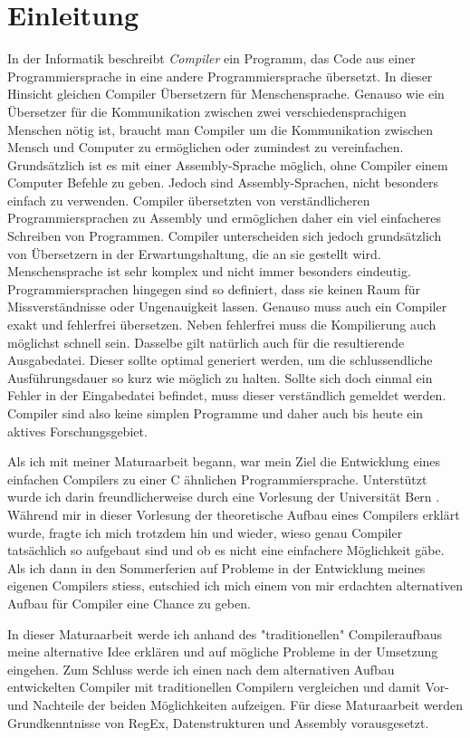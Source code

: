 \chapter{Einleitung}
In der Informatik beschreibt \textit{Compiler} ein Programm, das Code aus einer Programmiersprache in eine andere Programmiersprache übersetzt. In dieser Hinsicht gleichen Compiler Übersetzern für Menschensprache.
Genauso wie ein Übersetzer für die Kommunikation zwischen zwei verschiedensprachigen Menschen nötig ist, braucht man Compiler um die Kommunikation zwischen Mensch und Computer zu ermöglichen oder zumindest zu vereinfachen.
Grundsätzlich ist es mit einer Assembly-Sprache möglich, ohne Compiler einem Computer Befehle zu geben. Jedoch sind Assembly-Sprachen, nicht besonders einfach zu verwenden.
Compiler übersetzten von verständlicheren Programmiersprachen zu Assembly und ermöglichen daher ein viel einfacheres Schreiben von Programmen.
Compiler unterscheiden sich jedoch grundsätzlich von Übersetzern in der Erwartungshaltung, die an sie gestellt wird. Menschensprache ist sehr komplex und nicht immer besonders eindeutig. 
Programmiersprachen hingegen sind so definiert, dass sie keinen Raum für Missverständnisse oder Ungenauigkeit lassen. Genauso muss auch ein Compiler exakt und fehlerfrei übersetzen.
Neben fehlerfrei muss die Kompilierung auch möglichst schnell sein. Dasselbe gilt natürlich auch für die resultierende Ausgabedatei. Dieser sollte optimal generiert werden, um die schlussendliche
Ausführungsdauer so kurz wie möglich zu halten. Sollte sich doch einmal ein Fehler in der Eingabedatei befindet, muss dieser verständlich gemeldet werden. Compiler sind also keine simplen Programme und daher auch bis heute
ein aktives Forschungsgebiet.

Als ich mit meiner Maturaarbeit begann, war mein Ziel die Entwicklung eines einfachen Compilers zu einer C ähnlichen Programmiersprache. Unterstützt wurde ich darin freundlicherweise durch eine Vorlesung der Universität Bern \cite{Lecture}.
Während mir in dieser Vorlesung der theoretische Aufbau eines Compilers erklärt wurde, fragte ich mich trotzdem hin und wieder, wieso genau Compiler tatsächlich so aufgebaut sind und
ob es nicht eine einfachere Möglichkeit gäbe. Als ich dann in den Sommerferien auf Probleme in der Entwicklung meines eigenen Compilers stiess, entschied ich mich einem von mir erdachten alternativen Aufbau für Compiler eine Chance zu geben. 

In dieser Maturaarbeit werde ich anhand des "traditionellen" Compileraufbaus meine alternative Idee erklären und auf mögliche Probleme in der Umsetzung eingehen.
Zum Schluss werde ich einen nach dem alternativen Aufbau entwickelten Compiler mit traditionellen Compilern vergleichen und damit Vor- und Nachteile der beiden Möglichkeiten aufzeigen.
Für diese Maturaarbeit werden Grundkenntnisse von RegEx, Datenstrukturen und Assembly vorausgesetzt.

